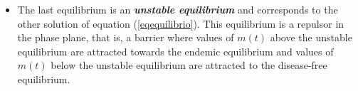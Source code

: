 \documentclass[eng]{MMSB-class-eng}
\begin{document}
{\begin{itemize}
	\item The last equilibrium is an \textit{\textbf{unstable equilibrium}} and corresponds to the other solution of equation (\ref{eqequilibrio}).
	This equilibrium is a repulsor in the phase plane, that is, a barrier where values of $m(t)$ above the unstable equilibrium are attracted towards the endemic equilibrium and values of $m(t)$ below the unstable equilibrium are attracted to the disease-free equilibrium.
\end{itemize}







}
\end{document}
